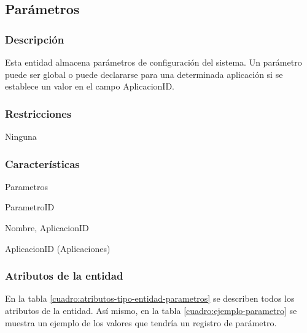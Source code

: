 \subsection{Parámetros}

\subsubsection*{Descripción}
Esta entidad almacena parámetros de configuración del sistema. Un parámetro puede ser global o puede declararse para una determinada aplicación si se establece un valor en el campo AplicacionID.

\subsubsection*{Restricciones}
Ninguna

\subsubsection*{Características}
\begin{description}[nosep,style=multiline,labelindent=0.8cm,leftmargin=4.5cm,font=\normalfont]
    \item[Nombre] Parametros
    \item[Id. principal] ParametroID
    \item[Id. alternativo] Nombre, AplicacionID
    \item[Atrib. heredados] AplicacionID (Aplicaciones)
\end{description}

\subsubsection*{Atributos de la entidad}
En la tabla \ref{cuadro:atributos-tipo-entidad-parametros} se describen todos los atributos de la entidad. Así mismo, en la tabla \ref{cuadro:ejemplo-parametro} se muestra un ejemplo de los valores que tendría un registro de parámetro.

